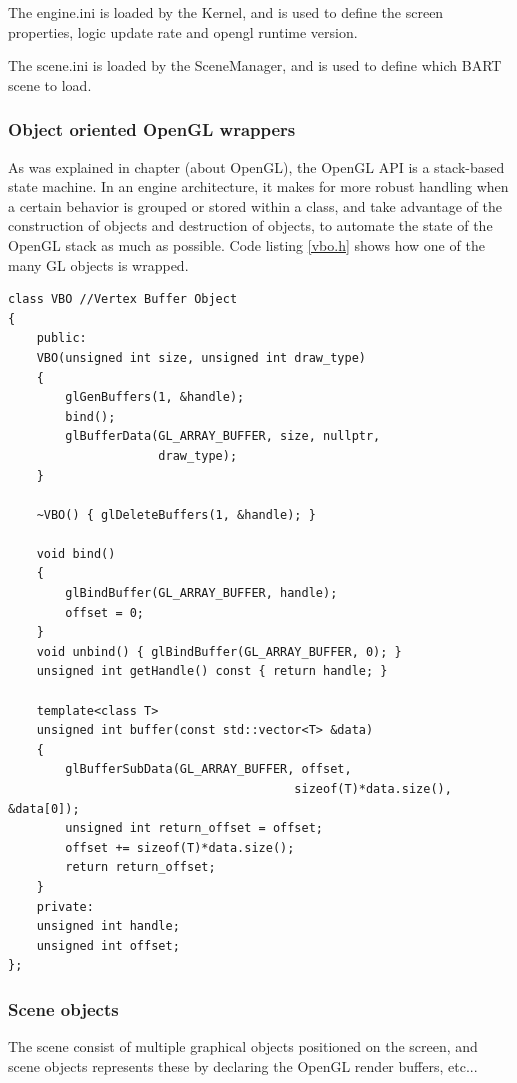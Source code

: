 The engine.ini is loaded by the Kernel, and is used to define the screen properties, logic update rate and opengl runtime version.

The scene.ini is loaded by the SceneManager, and is used to define which BART scene to load.

\subsubsection{Object oriented OpenGL wrappers}
As was explained in chapter (about OpenGL), the OpenGL API is a stack-based state machine. In an engine architecture, it makes for more robust handling when a certain behavior is grouped or stored within a class, and take advantage of the construction of objects and destruction of objects, to automate the state of the OpenGL stack as much as possible. Code listing \ref{vbo.h} shows how one of the many GL objects is wrapped.

\begin{lstlisting}
class VBO //Vertex Buffer Object
{
	public:
	VBO(unsigned int size, unsigned int draw_type)
	{
		glGenBuffers(1, &handle);
		bind();
		glBufferData(GL_ARRAY_BUFFER, size, nullptr, 
		             draw_type);
	}
	
	~VBO() { glDeleteBuffers(1, &handle); }
	
	void bind()
	{
		glBindBuffer(GL_ARRAY_BUFFER, handle);
		offset = 0;
	}
	void unbind() { glBindBuffer(GL_ARRAY_BUFFER, 0); }
	unsigned int getHandle() const { return handle; }
	
	template<class T>
	unsigned int buffer(const std::vector<T> &data)
	{
		glBufferSubData(GL_ARRAY_BUFFER, offset, 
										sizeof(T)*data.size(), &data[0]);
		unsigned int return_offset = offset;
		offset += sizeof(T)*data.size();
		return return_offset;
	}
	private:
	unsigned int handle;
	unsigned int offset;
};
\end{lstlisting}

\subsubsection{Scene objects}

The scene consist of multiple graphical objects positioned on the screen, and scene objects represents these by declaring the OpenGL render buffers, etc...

